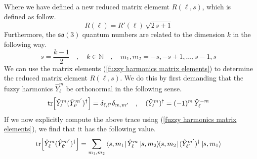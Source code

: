 %
%
Where we have defined a new reduced matrix elememt $R(\ell,s)$, which is defined as follow.
%
%
\begin{equation}
R(\ell) = R'(\ell) \, \sqrt{2 \, s + 1}
\end{equation}
%
%
Furthermore, the $\mathfrak{so}(3)$ quantum numbers are related to the dimension $k$ in the following way. 
%
%
\begin{equation}
s = \frac{k - 1}{2} 
%
\quad , \quad
%
k \in \mathbb{N}
%
\quad , \quad
%
m_1,m_2 = -s,-s+1,\ldots,s-1,s
\end{equation}
%
%
We can use the matrix elements (\ref{fuzzy harmonics matrix elements}) to determine the reduced matrix element $R(\ell,s)$. We do this by first demanding that the fuzzy harmonics $\hat{Y}^m_\ell$ be orthonormal in the following sense.
%
%
\begin{equation}\label{fuzzy harmonics so(3) orthogonal condition}
\tr[\hat{Y}^{m}_{\ell} (\hat{Y}^{m'}_{\ell'})^\dagger]
=
\delta_{\ell,\ell'} \delta_{m,m'}
%
\quad , \quad
%
(\hat{Y}^{m}_{\ell})^\dagger
=
(-1)^{m} \, \hat{Y}^{-m}_{\ell}
\end{equation}
%
%
If we now explicitly compute the above trace using (\ref{fuzzy harmonics matrix elements}), we find that it has the following value.
%
%
\begin{equation*}
\tr[\hat{Y}^{m}_{\ell} (\hat{Y}^{m'}_{\ell'})^\dagger]
=
\sum_{m_1,m_2}
\bra{s, m_1} \hat{Y}^m_\ell \ketbra{s,m_2}{s,m_2} (\hat{Y}^{m'}_{\ell'})^\dagger \ket{s, m_1}
\end{equation*}
